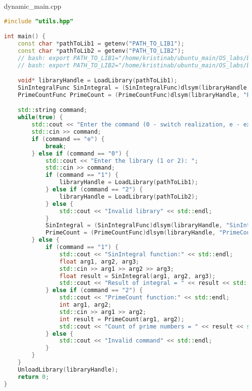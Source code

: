 \documentclass[a4paper, 12pt]{article}
\begin{document}
dynamic\_main.cpp
\begin{lstlisting}[language=C++]
#include "utils.hpp"

int main() {
    const char *pathToLib1 = getenv("PATH_TO_LIB1");
    const char *pathToLib2 = getenv("PATH_TO_LIB2");
    // bash: export PATH_TO_LIB1="/home/kristinab/ubuntu_main/OS_labs/build/lab4/librealization1.so"
    // bash: export PATH_TO_LIB2="/home/kristinab/ubuntu_main/OS_labs/build/lab4/librealization2.so"

    void* libraryHandle = LoadLibrary(pathToLib1);
    SinIntegralFunc SinIntegral = (SinIntegralFunc)dlsym(libraryHandle, "SinIntegral");
    PrimeCountFunc PrimeCount = (PrimeCountFunc)dlsym(libraryHandle, "PrimeCount");

    std::string command;
    while(true) {
        std::cout << "Enter the command (0 - switch realization, e - exit): ";
        std::cin >> command;
        if (command == "e") {
            break;
        } else if (command == "0") {
            std::cout << "Enter the library (1 or 2): ";
            std::cin >> command;
            if (command == "1") {
                libraryHandle = LoadLibrary(pathToLib1);
            } else if (command == "2") {
                libraryHandle = LoadLibrary(pathToLib2);
            } else {
                std::cout << "Invalid library" << std::endl;
            }
            SinIntegral = (SinIntegralFunc)dlsym(libraryHandle, "SinIntegral");
            PrimeCount = (PrimeCountFunc)dlsym(libraryHandle, "PrimeCount");
        } else {
            if (command == "1") {
                std::cout << "SinIntegral function:" << std::endl;
                float arg1, arg2, arg3;
                std::cin >> arg1 >> arg2 >> arg3;
                float result = SinIntegral(arg1, arg2, arg3);
                std::cout << "Result of integral = " << result << std::endl;
            } else if (command == "2") {
                std::cout << "PrimeCount function:" << std::endl;
                int arg1, arg2;
                std::cin >> arg1 >> arg2;
                int result = PrimeCount(arg1, arg2);
                std::cout << "Count of prime numbers = " << result << std::endl;
            } else {
                std::cout << "Invalid command" << std::endl;
            }
        }
    }
    UnloadLibrary(libraryHandle);
    return 0;
}
\end{lstlisting}
\end{document}
